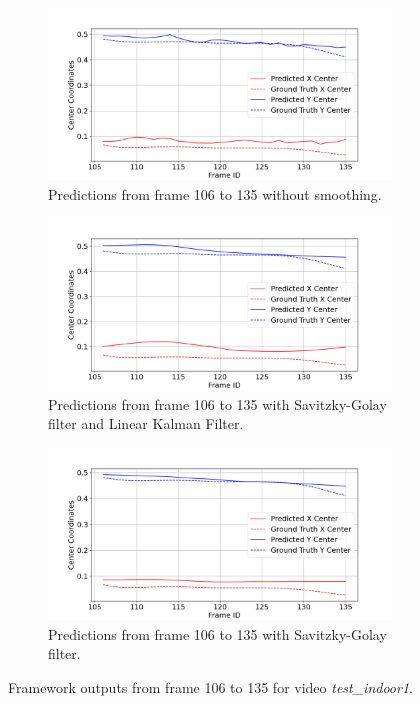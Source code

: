 \documentclass[12pt,oneside]{book} %
\begin{document}
\begin{figure}[H]
    \centering
    \begin{subfigure}[t]{0.9\textwidth}
        \includegraphics[width=\textwidth]{figures/framework/test_indoor1 Raw Data - 2.png}
        \caption{Predictions from frame 106 to 135 without smoothing.}
        \label{fig:framework-test_indoor1-2-raw}
    \end{subfigure}
    \hfill
    \begin{subfigure}[t]{0.9\textwidth}
        \includegraphics[width=\textwidth]{figures/framework/test_indoor1 LKF SA Filter - 2.png}
        \caption{Predictions from frame 106 to 135 with Savitzky-Golay filter and Linear Kalman Filter.}
        \label{fig:framework-test_indoor1-2-sa-lkf}
    \end{subfigure}
    \vfill
    \begin{subfigure}[t]{0.9\textwidth}
        \includegraphics[width=\textwidth]{figures/framework/test_indoor1 SA Filter - 2.png}
        \caption{Predictions from frame 106 to 135 with Savitzky-Golay filter.}
        \label{fig:framework-test_indoor1-2-sa}
    \end{subfigure}
    \caption{Framework outputs from frame 106 to 135 for video \textit{test\_indoor1}.}
    \label{fig:framework-test_indoor1-2}
\end{figure}
\end{document}
